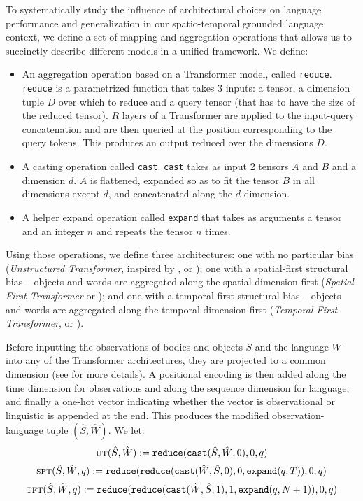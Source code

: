 To systematically study the influence of architectural choices on language performance and generalization in our spatio-temporal grounded language context, we define a set of mapping and aggregation operations that allows us to succinctly describe different models in a unified framework. We define:
%
\begin{itemize}[noitemsep]
\item An aggregation operation based on a Transformer model, called \texttt{reduce}. \texttt{reduce} is a parametrized function that takes 3 inputs: a tensor, a dimension tuple $D$ over which to reduce and a query tensor (that has to have the size of the reduced tensor). $R$ layers of a Transformer are applied to the input-query concatenation and are then queried at the position corresponding to the query tokens. This produces an output reduced over the dimensions $D$.
\item A casting operation called \texttt{cast}. \texttt{cast} takes as input 2 tensors $A$ and $B$ and a dimension $d$. $A$ is flattened, expanded so as to fit the tensor $B$ in all dimensions except $d$, and concatenated along the $d$ dimension.
\item A helper expand operation called \texttt{expand} that takes as arguments a tensor and an integer $n$ and repeats the tensor $n$ times.
\end{itemize}
 
Using those operations, we define three architectures: one with no particular bias (\textit{Unstructured Transformer}, inspired by \citet{ding2020objectbased}, or \utm); one with a spatial-first structural bias -- objects and words are aggregated along the spatial dimension first (\textit{Spatial-First Transformer} or \stm); and one with a temporal-first structural bias -- objects and words are aggregated along the temporal dimension first (\textit{Temporal-First Transformer}, or \ttm).

Before inputting the observations of bodies and objects $S$ and the language $W$ into any of the Transformer architectures, they are projected to a common dimension (see  for more details). A positional encoding \cite{vaswani2017attention} is then added along the time dimension for observations and along the sequence dimension for language; and finally a one-hot vector indicating whether the vector is observational or linguistic is appended at the end. This produces the modified observation-language tuple $(\hat{S}, \hat{W})$. We let:
%
\[ \textsc{ut}(\hat{S}, \hat{W}) := \texttt{reduce}(\texttt{cast}(\hat{S}, \hat{W}, 0), 0, q) \]
\[ \textsc{sft}(\hat{S}, \hat{W}, q) := \texttt{reduce}(\texttt{reduce}(\texttt{cast}(\hat{W}, \hat{S}, 0), 0, \texttt{expand}(q, T)), 0, q) \]
\[ \textsc{tft}(\hat{S}, \hat{W}, q) := \texttt{reduce}(\texttt{reduce}(\texttt{cast}(\hat{W}, \hat{S}, 1), 1, \texttt{expand}(q, N + 1)), 0, q) \]

